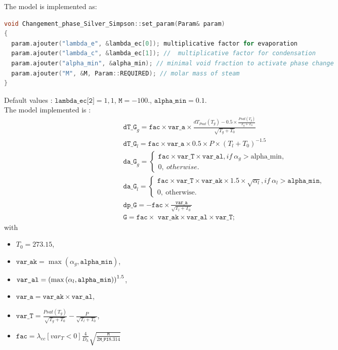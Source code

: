 The model is implemented as:
\begin{lstlisting}[language=c++]
void Changement_phase_Silver_Simpson::set_param(Param& param)
{
  param.ajouter("lambda_e", &lambda_ec[0]); multiplicative factor for evaporation
  param.ajouter("lambda_c", &lambda_ec[1]); //  multiplicative factor for condensation
  param.ajouter("alpha_min", &alpha_min); // minimal void fraction to activate phase change
  param.ajouter("M", &M, Param::REQUIRED); // molar mass of steam
}
\end{lstlisting}
Default values : $\texttt{lambda\_ec[2]} = { 1, 1 }$, $\texttt{M} = -100.$, $\texttt{alpha\_min} = 0.1$.\\
The model implemented is :
\begin{align}
  &\texttt{dT\_G}_g = \texttt{fac} \times \texttt{var\_a} \times \frac{dT_{Psat}(T_g) - 0.5 \times \frac{Psat(T_g)}{T_g + T_0}}{\sqrt{T_g + T_0}}\\
  &\texttt{dT\_G}_l = \texttt{fac} \times \texttt{var\_a} \times 0.5 \times P \times (T_l + T_0)^{-1.5}\\
  &\texttt{da\_G}_g = \begin{cases} \texttt{fac} \times \texttt{var\_T} \times \texttt{var\_al}, if\  \alpha_g > \text{alpha\_min}, \\ 0,\ otherwise.\end{cases}\\
  &\texttt{da\_G}_l = \begin{cases} \texttt{fac} \times \texttt{var\_T} \times \texttt{var\_ak} \times 1.5 \times \sqrt{\alpha_l}, if\ \alpha_l > \texttt{alpha\_min},\\ 0,\ \text{otherwise}.
  \end{cases}\\
  &\texttt{dp\_G} = - \texttt{fac} \times \frac{\texttt{var\_a}}{\sqrt{T_l + T_0}}\\
  &\texttt{G} = \texttt{fac} \times\texttt{ var\_ak} \times \texttt{var\_al} \times \texttt{var\_T};
\end{align}
with
\begin{itemize}
    \item[\small \textcolor{blue}{\ding{109}}]$T_0 = 273.15$,
    \item[\small \textcolor{blue}{\ding{109}}]$\texttt{var\_ak}=\max(\alpha_g, \texttt{alpha\_min})$,
    \item[\small \textcolor{blue}{\ding{109}}]$\texttt{var\_al}=\left( \max\left( \alpha_l,\texttt{alpha\_min} \right) \right)^{1.5}$,
    \item[\small \textcolor{blue}{\ding{109}}]$\texttt{var\_a}=\texttt{var\_ak} \times \texttt{var\_al}$,
    \item[\small \textcolor{blue}{\ding{109}}]$\texttt{var\_T} = \frac{Psat(T_g)}{\sqrt{T_g + T_0}}  - \frac{P}{\sqrt{T_l + T_0}}$,
    \item[\small \textcolor{blue}{\ding{109}}]$\texttt{fac} = \lambda_{ec}[var_T < 0] \frac{4}{D_h}\sqrt{\frac{\texttt{M}}{2\texttt{M_{PI}}8.314}}$
\end{itemize}

